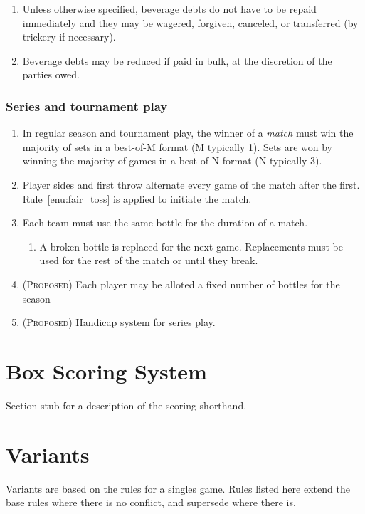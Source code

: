 \documentclass[11pt,letterpaper,twocolumn,english,DIV=calc]{scrartcl}
\newcommand{\proposed}{{\color{DarkRed} \textsc{(Proposed) }}}
\begin{document}
\begin{enumerate}[leftmargin=2.8em, label=\thesubsection.\arabic*]
	\item Unless otherwise specified, beverage debts do not have to be repaid immediately and they may be wagered, forgiven, canceled, or transferred (by trickery if necessary). 
	\item Beverage debts may be reduced if paid in bulk, at the discretion of the parties owed.
\end{enumerate}

\section{Series and tournament play}
\begin{enumerate}[label=\thesection.\arabic*]
	\item In regular season and tournament play, the winner of a \emph{match} must win the majority of sets in a best-of-M format (M typically 1). Sets are won by winning the majority of games in a best-of-N format (N typically 3).
	\item Player sides and first throw alternate every game of the match after the first.
	Rule~\ref{enu:fair_toss} is applied to initiate the match.
	
	\item Each team must use the same bottle for the duration of a match.

	\begin{enumerate}
		\item A broken bottle is replaced for the next game. 
		Replacements must be used for the rest of the match or until they break.
	\end{enumerate}
	\item \proposed Each player may be alloted a fixed number of bottles for the season
	\item \proposed Handicap system for series play.

\end{enumerate}

\newpage
\part*{Box Scoring System}
Section stub for a description of the scoring shorthand.

\part*{Variants}
\label{part:variants}

Variants are based on the rules for a singles game. Rules listed here extend the base rules where there is no conflict, and supersede where there is.
\end{document}
